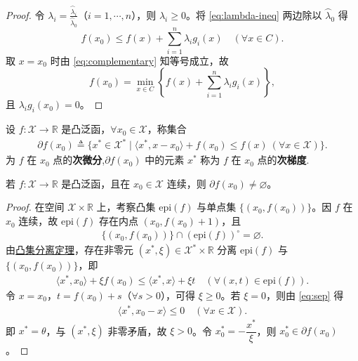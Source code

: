 \documentclass[../../main.tex]{subfiles}%
\begin{document}
\begin{proof}
令 $\lambda_i = \frac{\wideparen{\lambda}_i}{\wideparen{\lambda}_0}$（$i=1,\cdots,n$），则 $\lambda_i \geqslant 0$。将 \eqref{eq:lambda-ineq} 两边除以 $\wideparen{\lambda}_0$ 得
\[
f(x_0) \leqslant f(x) + \sum_{i=1}^n \lambda_i g_i(x) \quad (\forall x \in C).
\]
取 $x = x_0$ 时由 \eqref{eq:complementary} 知等号成立，故
\[
f(x_0) = \min_{x \in C} \left\{ f(x) + \sum_{i=1}^n \lambda_i g_i(x) \right\},
\]
且 $\lambda_i g_i(x_0)=0$。
\end{proof}

\begin{definition}
设 $f: \mathscr{X} \to \mathbb{R}$ 是凸泛函，$\forall x_0 \in \mathscr{X}$，称集合
\begin{align*}
\partial f(x_0) \triangleq \{ x^* \in \mathscr{X}^* \mid \langle x^*, x - x_0 \rangle + f(x_0) \leqslant f(x) \ (\forall x \in \mathscr{X}) \}.
\end{align*}
为 $f$ 在 $x_0$ 点的\textbf{次微分},$\partial f(x_0)$ 中的元素 $x^*$ 称为 $f$ 在 $x_0$ 点的\textbf{次梯度}.
\end{definition}

\begin{theorem}
若 $f: \mathscr{X} \to \mathbb{R}$ 是凸泛函，且在 $x_0 \in \mathscr{X}$ 连续，则 $\partial f(x_0) \neq \varnothing$。
\end{theorem}
\begin{proof}

在空间 $\mathscr{X} \times \mathbb{R}$ 上，考察凸集 $\mathrm{epi}(f)$ 与单点集 $\{(x_0, f(x_0))\}$。因 $f$ 在 $x_0$ 连续，故 $\mathrm{epi}(f)$ 存在内点 $(x_0, f(x_0)+1)$，且
\begin{align*}
\{(x_0, f(x_0))\} \cap (\mathrm{epi}(f))^\circ = \varnothing.
\end{align*}
由\hyperref[theorem:泛函分析--凸集分离定理]{凸集分离定理}，存在非零元 $(x^*, \xi) \in \mathscr{X}^* \times \mathbb{R}$ 分离 $\mathrm{epi}(f)$ 与 $\{(x_0, f(x_0))\}$，即
\begin{align}
\langle x^*, x_0 \rangle + \xi f(x_0) \leqslant \langle x^*, x \rangle + \xi t \quad (\forall (x,t) \in \mathrm{epi}(f)).
\label{eq:sep}
\end{align}
令 $x = x_0$，$t = f(x_0) + s$（$\forall s > 0$），可得 $\xi \geqslant 0$。若 $\xi = 0$，则由 \eqref{eq:sep} 得
\begin{align*}
\langle x^*, x_0 - x \rangle \leqslant 0 \quad (\forall x \in \mathscr{X}).
\end{align*}
即 $x^* = \theta$，与 $(x^*, \xi)$ 非零矛盾，故 $\xi > 0$。令 $x_0^* = -\dfrac{x^*}{\xi}$，则 $x_0^* \in \partial f(x_0)$。

\end{proof}
\end{document}

